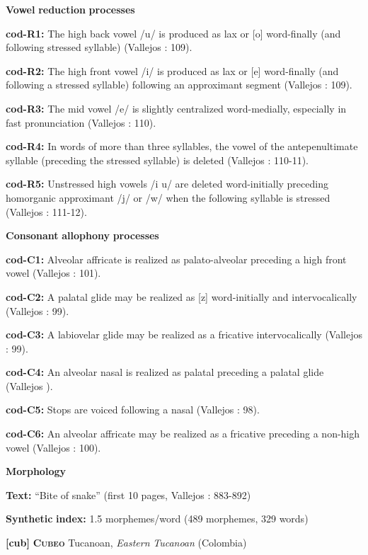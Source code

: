 \textbf{Vowel} \textbf{reduction} \textbf{processes}

\textbf{cod-R1:} The high back vowel /u/ is produced as lax or [o] word-finally (and following stressed syllable) (Vallejos \citealt{Yopán2010}: 109).

\textbf{cod-R2:} The high front vowel /i/ is produced as lax or [e] word-finally (and following a stressed syllable) following an approximant segment (Vallejos \citealt{Yopán2010}: 109).

\textbf{cod-R3:} The mid vowel /e/ is slightly centralized word-medially, especially in fast pronunciation (Vallejos \citealt{Yopán2010}: 110).

\textbf{cod-R4:} In words of more than three syllables, the vowel of the antepenultimate syllable (preceding the stressed syllable) is deleted (Vallejos \citealt{Yopán2010}: 110-11).

\textbf{cod-R5:} Unstressed high vowels /i u/ are deleted word-initially preceding homorganic approximant /j/ or /w/ when the following syllable is stressed (Vallejos \citealt{Yopán2010}: 111-12).

\textbf{Consonant} \textbf{allophony} \textbf{processes}

\textbf{cod-C1:} Alveolar affricate is realized as palato-alveolar preceding a high front vowel (Vallejos \citealt{Yopán2010}: 101).

\textbf{cod-C2:} A palatal glide may be realized as [z] word-initially and intervocalically (Vallejos \citealt{Yopán2010}: 99).

\textbf{cod-C3:} A labiovelar glide may be realized as a fricative intervocalically (Vallejos \citealt{Yopán2010}: 99).

\textbf{cod-C4:} An alveolar nasal is realized as palatal preceding a palatal glide (Vallejos \citealt{Yopán2010}).

\textbf{cod-C5:} Stops are voiced following a nasal (Vallejos \citealt{Yopán2010}: 98).

\textbf{cod-C6:} An alveolar affricate may be realized as a fricative preceding a non-high vowel (Vallejos \citealt{Yopán2010}: 100).

\textbf{Morphology}

\textbf{Text:} “Bite of snake” (first 10 pages, Vallejos \citealt{Yopán2010}: 883-892)

\textbf{Synthetic} \textbf{index:} 1.5 morphemes/word (489 morphemes, 329 words)

\textbf{[cub]}   \textbf{\textsc{Cubeo}}    Tucanoan, \textit{Eastern} \textit{Tucanoan} (Colombia)

